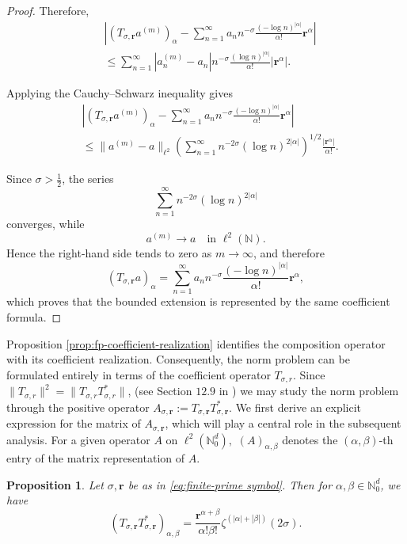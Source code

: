\documentclass[12pt, reqno]{amsart}
\numberwithin{equation}{section}
\newtheorem{proposition}[theorem]{Proposition}
\begin{document}
\begin{proof}
Therefore,
\[
\begin{aligned}
&
\left|
(T_{\sigma,\boldsymbol{r}}a^{(m)})_\alpha
-
\sum_{n=1}^{\infty}
a_n
n^{-\sigma}
\frac{(-\log n)^{|\alpha|}}{\alpha!}
\boldsymbol{r}^\alpha
\right|
\\
&\le
\sum_{n=1}^{\infty}
|a_n^{(m)}-a_n|
n^{-\sigma}
\frac{(\log n)^{|\alpha|}}{\alpha!}
|\boldsymbol{r}^\alpha|.
\end{aligned}
\]

Applying the Cauchy--Schwarz inequality gives
\[
\begin{aligned}
&
\left|
(T_{\sigma,\boldsymbol{r}}a^{(m)})_\alpha
-
\sum_{n=1}^{\infty}
a_n
n^{-\sigma}
\frac{(-\log n)^{|\alpha|}}{\alpha!}
\boldsymbol{r}^\alpha
\right|
\\
&\le
\|a^{(m)}-a\|_{\ell^2}
\left(
\sum_{n=1}^{\infty}
n^{-2\sigma}
(\log n)^{2|\alpha|}
\right)^{1/2}
\frac{|\boldsymbol{r}^\alpha|}{\alpha!}.
\end{aligned}
\]

Since $\sigma>\frac12$, the series
\[
\sum_{n=1}^{\infty}
n^{-2\sigma}
(\log n)^{2|\alpha|}
\]
converges, while
\[
a^{(m)}\rightarrow a
\quad\text{in }\ell^2(\mathbb N).
\]
Hence the right-hand side tends to zero as $m\rightarrow\infty$, and therefore
\[
(T_{\sigma,\boldsymbol{r}}a)_\alpha
=
\sum_{n=1}^{\infty}
a_n
n^{-\sigma}
\frac{(-\log n)^{|\alpha|}}{\alpha!}
\boldsymbol{r}^\alpha,
\]
which proves that the bounded extension is represented by the same
coefficient formula.
\end{proof}

Proposition \ref{prop:fp-coefficient-realization} identifies the composition operator with its coefficient realization. Consequently, the norm problem can be formulated entirely in terms of the coefficient operator $T_{\sigma,r}.$
Since $\|T_{\sigma,r}\|^2=\|T_{\sigma,r}T_{\sigma,r}^*\|$, (see Section $12.9$ in \cite{Ru91})
we may study the norm problem through the positive operator
$A_{\sigma,\boldsymbol r}
:=
T_{\sigma,\boldsymbol r}T_{\sigma,\boldsymbol r}^*$. We first derive an explicit expression for the matrix of $A_{\sigma,\boldsymbol r}$, which will play a central role in the subsequent  analysis. For a given operator $A$ on $\ell^2(\mathbb{N}_{0}^{d}),$ $(A)_{\alpha,\beta}$ denotes the $(\alpha,\beta)$-th entry of the matrix representation of $A.$


\begin{proposition}
\label{prop:fp-output-kernel}
Let $\sigma, \boldsymbol{r}$ be as in \eqref{eq:finite-prime symbol}. Then
for $\alpha,\beta\in\mathbb{N}_{0}^{d}$,
we have
\[
(T_{\sigma,\boldsymbol{r}}T_{\sigma,\boldsymbol{r}}^{*})_{\alpha,\beta}
=
\frac{\boldsymbol{r}^{\alpha+\beta}}{\alpha!\beta!}
\zeta^{(|\alpha|+|\beta|)}(2\sigma).
\]
\end{proposition}
\end{document}
